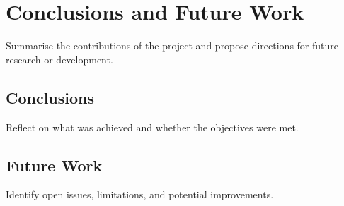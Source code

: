 \chapter{Conclusions and Future Work}
\label{chap:conclusions}

Summarise the contributions of the project and propose
directions for future research or development.

\section{Conclusions}
\label{sec:conclusions}

Reflect on what was achieved and whether the objectives were met.

\section{Future Work}
\label{sec:futurework}

Identify open issues, limitations, and potential improvements.
